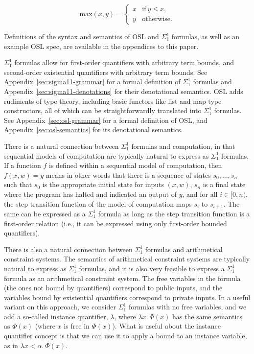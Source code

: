 \documentclass[11pt]{article}
\begin{document}
\begin{equation}
	\text{max}(x, y) = \begin{cases}
		x & \text{if}\ y \leq x, \\
		y & \text{otherwise}.
	\end{cases}
\end{equation}

Definitions of the syntax and semantics of OSL and $\Sigma^1_1$ formulas, as well as an example OSL spec, are available in the appendices to this paper.

$\Sigma^1_1$ formulas allow for first-order quantifiers with arbitrary term bounds, and second-order existential quantifiers with arbitrary term bounds. See Appendix~\ref{sec:sigma11-grammar} for a formal definition of $\Sigma^1_1$ formulas and Appendix~\ref{sec:sigma11-denotations} for their denotational semantics. OSL adds rudiments of type theory, including basic functors like list and map type constructors, all of which can be straightforwardly translated into $\Sigma^1_1$ formulas. See Appendix~\ref{sec:osl-grammar} for a formal definition of OSL, and Appendix~\ref{sec:osl-semantics} for its denotational semantics.

There is a natural connection between $\Sigma^1_1$ formulas and computation, in that sequential models of computation are typically natural to express as $\Sigma^1_1$ formulas. If a function $f$ is defined within a sequential model of computation, then $f(x, w) = y$ means in other words that there is a sequence of states $s_0, ..., s_n$ such that $s_0$ is the appropriate initial state for inputs $(x, w)$, $s_n$ is a final state where the program has halted and indicated an output of $y$, and for all $i \in [0, n)$, the step transition function of the model of computation maps $s_i$ to $s_{i+1}$. The same can be expressed as a $\Sigma^1_1$ formula as long as the step transition function is a first-order relation (i.e., it can be expressed using only first-order bounded quantifiers).

There is also a natural connection between $\Sigma^1_1$ formulas and arithmetical constraint systems. The semantics of arithmetical constraint systems are typically natural to express as $\Sigma^1_1$ formulas, and it is also very feasible to express a $\Sigma^1_1$ formula as an arithmetical constraint system. The free variables in the formula (the ones not bound by quantifiers) correspond to public inputs, and the variables bound by existential quantifiers correspond to private inputs. In a useful variant on this approach, we consider $\Sigma^1_1$ formulas with no free variables, and we add a so-called instance quantifier, $\lambda$, where $\lambda x.\ \Phi(x)$ has the same semantics as $\Phi(x)$ (where $x$ is free in $\Phi(x)$). What is useful about the instance quantifier concept is that we can use it to apply a bound to an instance variable, as in $\lambda x < \alpha.\ \Phi(x)$.
\end{document}
